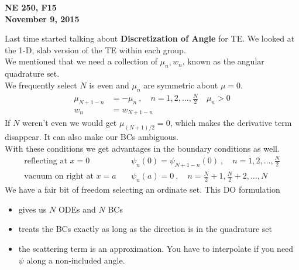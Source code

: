 \documentclass[12pt]{article}
\begin{document}
\begin{center}
{\bf NE 250, F15\\
November 9, 2015 
}
\end{center}

Last time started talking about \textbf{Discretization of Angle} for TE. We looked at the 1-D, slab version of the TE within each group.\\
We mentioned that we need a collection of $\mu_n, w_n$, known as the angular quadrature set. \\
We frequently select $N$ is even and $\mu_n$ are symmetric about $\mu=0$.
%
\begin{align*}
\mu_{N+1-n} &= -\mu_n\:, \quad n = 1, 2, \dots, \frac{N}{2} \quad \mu_n > 0\\
w_n &= w_{N+1-n}
\end{align*}
%
If $N$ weren't even we would get $\mu_{(N+1)/2} = 0$, which makes the derivative term disappear. It can also make our BCs ambiguous.\\
With these conditions we get advantages in the boundary conditions as well.
%
\begin{align*}
\text{reflecting at } x=0 \quad &\psi_n(0) = \psi_{N+1-n}(0)\:, \quad n = 1, 2, \dots, \frac{N}{2}\\
\text{vacuum on right at } x=a \quad &\psi_n(a) = 0\:, \quad n = \frac{N}{2}+1, \frac{N}{2}+2, \dots, N
\end{align*}
%
We have a fair bit of freedom selecting an ordinate set. 
This DO formulation
\begin{itemize}
\item gives us $N$ ODEs and $N$ BCs
\item treats the BCs exactly as long as the direction is in the quadrature set
\item the scattering term is an approximation. You have to interpolate if you need $\psi$ along a non-included angle.
\end{itemize}
\end{document}
